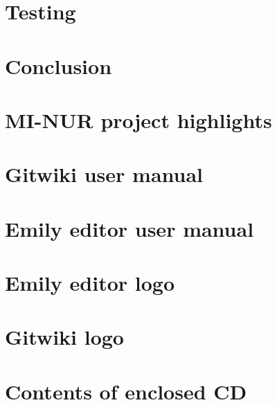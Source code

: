 \documentclass[thesis=M,english,10pt]{FITthesis}[2012/10/20]
\begin{document}
\chapter{Testing}\label{chapter:testing}




\chapter{Conclusion}






\appendix

\printglossaries


\chapter{MI-NUR project highlights}\label{app:nur}


\chapter{Gitwiki user manual}\label{app:gitwiki}


\chapter{Emily editor user manual}\label{app:emily}


\chapter{Emily editor logo}\label{app:emily-logo}


\chapter{Gitwiki logo}\label{app:gitwiki-logo}



\chapter{Contents of enclosed CD}
\end{document}

